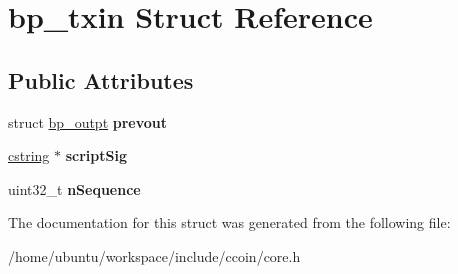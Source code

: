 \hypertarget{structbp__txin}{\section{bp\-\_\-txin Struct Reference}
\label{structbp__txin}
}
\subsection*{Public Attributes}
\begin{DoxyCompactItemize}
\item 
\hypertarget{structbp__txin_a108d8af2ddb0830976cd57e5af845f79}{struct \hyperlink{structbp__outpt}{bp\-\_\-outpt} {\bfseries prevout}}\label{structbp__txin_a108d8af2ddb0830976cd57e5af845f79}

\item 
\hypertarget{structbp__txin_a6df42e633b1a8b47c8ea0487a4faddc5}{\hyperlink{structcstring}{cstring} $\ast$ {\bfseries script\-Sig}}\label{structbp__txin_a6df42e633b1a8b47c8ea0487a4faddc5}

\item 
\hypertarget{structbp__txin_a0da507f2f18e6a1d5f61016853f620bb}{uint32\-\_\-t {\bfseries n\-Sequence}}\label{structbp__txin_a0da507f2f18e6a1d5f61016853f620bb}

\end{DoxyCompactItemize}


The documentation for this struct was generated from the following file\-:\begin{DoxyCompactItemize}
\item 
/home/ubuntu/workspace/include/ccoin/core.\-h\end{DoxyCompactItemize}
